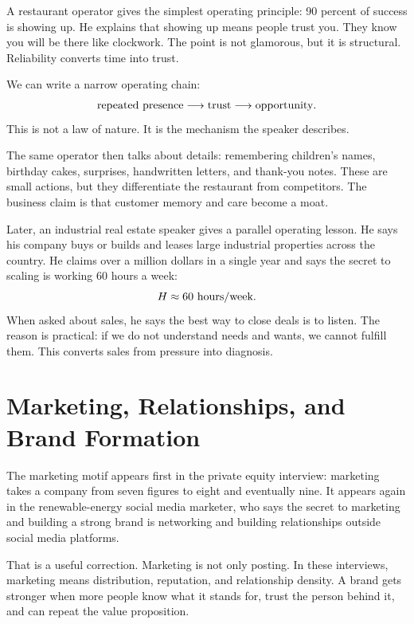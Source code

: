 A restaurant operator gives the simplest operating principle: 90 percent of success is showing up. He explains that showing up means people trust you. They know you will be there like clockwork. The point is not glamorous, but it is structural. Reliability converts time into trust.

We can write a narrow operating chain:
\begin{equation}
\hbox{repeated presence}\longrightarrow
\hbox{trust}\longrightarrow
\hbox{opportunity}.
\end{equation}
This is not a law of nature. It is the mechanism the speaker describes.

The same operator then talks about details: remembering children's names, birthday cakes, surprises, handwritten letters, and thank-you notes. These are small actions, but they differentiate the restaurant from competitors. The business claim is that customer memory and care become a moat.

Later, an industrial real estate speaker gives a parallel operating lesson. He says his company buys or builds and leases large industrial properties across the country. He claims over a million dollars in a single year and says the secret to scaling is working 60 hours a week:
\begin{equation}
H\approx 60\ \hbox{hours/week}.
\end{equation}
When asked about sales, he says the best way to close deals is to listen. The reason is practical: if we do not understand needs and wants, we cannot fulfill them. This converts sales from pressure into diagnosis.

\section{Marketing, Relationships, and Brand Formation}

The marketing motif appears first in the private equity interview: marketing takes a company from seven figures to eight and eventually nine. It appears again in the renewable-energy social media marketer, who says the secret to marketing and building a strong brand is networking and building relationships outside social media platforms.

That is a useful correction. Marketing is not only posting. In these interviews, marketing means distribution, reputation, and relationship density. A brand gets stronger when more people know what it stands for, trust the person behind it, and can repeat the value proposition.

